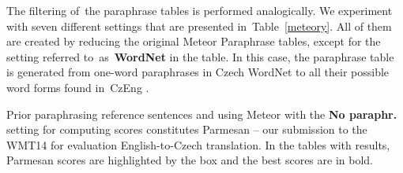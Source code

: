 \documentclass[11pt]{article}
\def \xxx#1{\textbf{\textcolor{red}{xxx: #1}}}
\def\Tref#1{Table~\ref{#1}}
\begin{document}
\begin{table}[htb]
\begin{center}

\caption{Different paraphrase tables for Meteor and their size (number of paraphrase pairs).}
\label{meteory}
\end{center}
\end{table}

The filtering of~the paraphrase tables is performed analogically. We experiment
with seven different settings that are presented in~\Tref{meteory}. All of them
are created by reducing the original Meteor Paraphrase tables, except for the 
setting referred to~as~\textbf{WordNet} in the table. In this case, the 
paraphrase table is generated from one-word paraphrases in Czech WordNet to all
their possible word forms found in~CzEng \cite{czeng}.

Prior paraphrasing reference sentences and using Meteor with the \textbf{No 
paraphr.} setting for computing scores constitutes Parmesan -- our submission
to the WMT14 \cite{wmt14} for evaluation English-to-Czech translation. In the 
tables with results, Parmesan scores are highlighted by the box and the best 
scores are in bold. %
\end{document}
